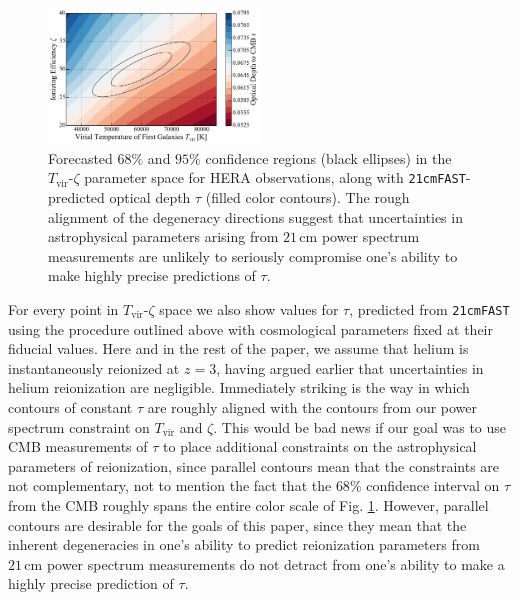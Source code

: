\documentclass[twocolumn,aps,prd,nofootinbib,showpacs,superscriptaddress]{revtex4-1}
\begin{document}
\begin{figure}[!]
	\centering
	\includegraphics[width=0.5\textwidth]{figures/21cmDegen_wTau.pdf}
	\caption{Forecasted $68\%$ and $95\%$ confidence regions (black ellipses) in the $T_\textrm{vir}$-$\zeta$ parameter space for HERA observations, along with {\tt 21cmFAST}-predicted optical depth $\tau$ (filled color contours). The rough alignment of the degeneracy directions suggest that uncertainties in astrophysical parameters arising from $21\,\textrm{cm}$ power spectrum measurements are unlikely to seriously compromise one's ability to make highly precise predictions of $\tau$.}
	\label{fig:21cmDegen_wTau}
\end{figure}

For every point in $T_\textrm{vir}$-$\zeta$ space we also show values for $\tau$, predicted from {\tt 21cmFAST} using the procedure outlined above with cosmological parameters fixed at their fiducial values. Here and in the rest of the paper, we assume that helium is instantaneously reionized at $z = 3$, having argued earlier that uncertainties in helium reionization are negligible. Immediately striking is the way in which contours of constant $\tau$ are roughly aligned with the contours from our power spectrum constraint on $T_\textrm{vir}$ and $\zeta$. This would be bad news if our goal was to use CMB measurements of $\tau$ to place additional constraints on the astrophysical parameters of reionization, since parallel contours mean that the constraints are not complementary, not to mention the fact that the $68\%$ confidence interval on $\tau$ from the CMB roughly spans the entire color scale of Fig. \ref{fig:21cmDegen_wTau}. However, parallel contours are desirable for the goals of this paper, since they mean that the inherent degeneracies in one's ability to predict reionization parameters from $21\,\textrm{cm}$ power spectrum measurements do not detract from one's ability to make a highly precise prediction of $\tau$.
\end{document}
